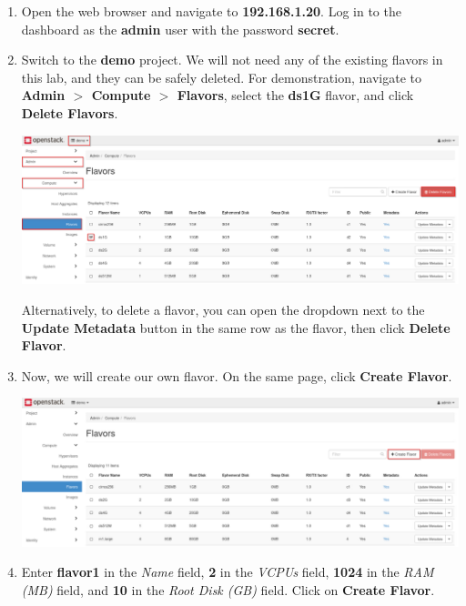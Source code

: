 \documentclass[letterpaper, 12pt]{article}
\begin{document}
\begin{enumerate}
    \item Open the web browser and navigate to \textbf{192.168.1.20}. Log in to the dashboard as the \textbf{admin} user
    with the password \textbf{secret}.
    
    \item Switch to the \textbf{demo} project. We will not need any of the existing flavors in this lab, and they can be
    safely deleted. For demonstration, navigate to \textbf{Admin $>$ Compute $>$ Flavors}, select the \textbf{ds1G}
    flavor, and click \textbf{Delete Flavors}.

    \begin{center}
        \includegraphics[width=\linewidth]{images/part2/step2.png}
    \end{center}

    \begin{tipbox}
        Alternatively, to delete a flavor, you can open the dropdown next to the \textbf{Update Metadata} button in the
        same row as the flavor, then click \textbf{Delete Flavor}.
    \end{tipbox}

    \item Now, we will create our own flavor. On the same page, click \textbf{Create Flavor}.

    \begin{center}
        \includegraphics[width=\linewidth]{images/part2/step3.png}
    \end{center}

    \item Enter \textbf{flavor1} in the \textit{Name} field, \textbf{2} in the \textit{VCPUs} field, \textbf{1024} in
    the \textit{RAM (MB)} field, and \textbf{10} in the \textit{Root Disk (GB)} field. Click on \textbf{Create Flavor}.


\end{enumerate}
\end{document}
